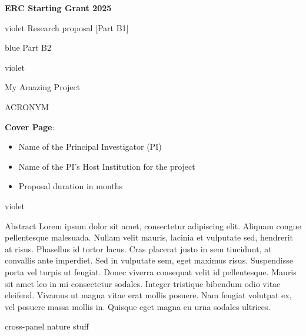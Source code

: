\documentclass[11pt,a4paper]{article}
\newenvironment{b1}{\begin{color}{violet}}{\end{color}}
\newenvironment{b2}{\begin{color}{blue}}{\end{color}}
\begin{document}
\begin{center}
	\bfseries\Large
	ERC Starting Grant 2025\par
	\begin{b1}
		Research proposal [Part B1]
	\end{b1}
	\begin{b2}
		Part B2
	\end{b2}
\end{center}


\begin{b1}
	\begin{center}
		\normalfont\huge
		\vspace{.5cm}My Amazing Project\par %
		\vspace{.2cm}ACRONYM\par %
	\end{center}
 
        \bigskip 
        \noindent\textbf{Cover Page}:
		\begin{itemize}[nosep,label={-}]
			\item Name of the Principal Investigator (PI)
            \item Name of the PI’s Host Institution for the project
            \item Proposal duration in months
		\end{itemize}
		\bigskip 
\end{b1}




\begin{b1}
	\begin{mdframed}
		
		Abstract
		Lorem ipsum dolor sit amet, consectetur adipiscing elit. Aliquam congue pellentesque malesuada. Nullam velit mauris, lacinia et vulputate sed, hendrerit at risus. Phasellus id tortor lacus. Cras placerat justo in sem tincidunt, at convallis ante imperdiet. Sed in vulputate sem, eget maximus risus. Suspendisse porta vel turpis ut feugiat. Donec viverra consequat velit id pellentesque. Mauris sit amet leo in mi consectetur sodales. Integer tristique bibendum odio vitae eleifend. Vivamus ut magna vitae erat mollis posuere. Nam feugiat volutpat ex, vel posuere massa mollis in. Quisque eget magna eu urna sodales ultrices.

	\end{mdframed}
	\begin{mdframed}

		cross-panel nature stuff

	\end{mdframed}
	\newpage
\end{b1}
\end{document}

